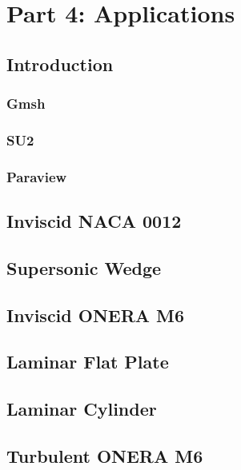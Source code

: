 \part{Part 4: Applications}


\chapter{Introduction}
\section{Gmsh}
\section{SU2}
\section{Paraview}

\chapter{Inviscid NACA 0012}

\chapter{Supersonic Wedge}

\chapter{Inviscid ONERA M6}

\chapter{Laminar Flat Plate}

\chapter{Laminar Cylinder}

\chapter{Turbulent ONERA M6}